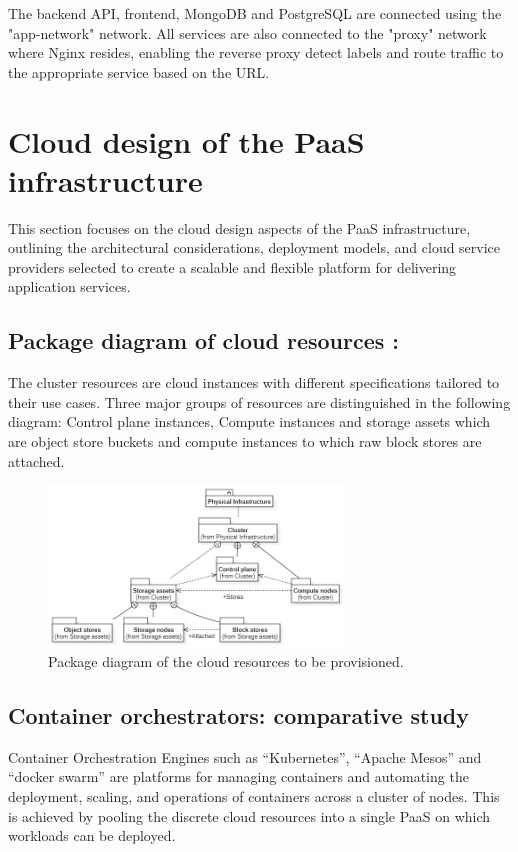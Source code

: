 \hspace{7mm}The backend API, frontend, MongoDB and PostgreSQL are connected using the "app-network" network. All services are also connected to the "proxy" network where Nginx resides, enabling the reverse proxy detect labels and route traffic to the appropriate service based on the URL.

\newpage

\section{Cloud design of the PaaS infrastructure}

\hspace{7mm}This section focuses on the cloud design aspects of the PaaS infrastructure, outlining the architectural considerations, deployment models, and cloud service providers selected to create a scalable and flexible platform for delivering application services.

\subsection{Package diagram of cloud resources :}

\hspace{7mm}The cluster resources are cloud instances with different specifications tailored to their use cases. Three major groups of resources are distinguished in the following diagram: Control plane instances, Compute instances and storage assets which are object store buckets and compute instances to which raw block stores are attached.

\begin{figure}[H]\centering
\includegraphics[width=0.7\textwidth,angle=00]{assets/f11.jpg}
\caption{Package diagram of the cloud resources to be provisioned.}
\label{fig:Package diagram of cloud resources }
\end{figure}

\subsection{Container orchestrators: comparative study}
\hspace{7mm}Container Orchestration Engines such as “Kubernetes”, “Apache Mesos” and “docker swarm” are platforms for managing containers and automating the deployment, scaling, and operations of containers across a cluster of nodes. This is achieved by pooling the discrete cloud resources into a single PaaS on which workloads can be deployed. 


